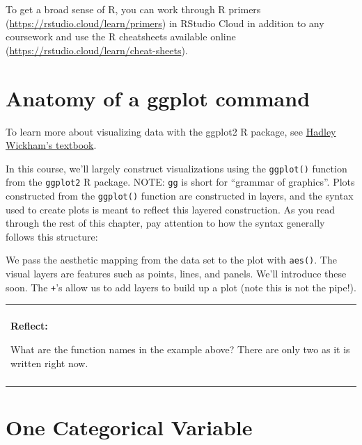 \documentclass[
]{book}
\newenvironment{Shaded}{\begin{snugshade}}{\end{snugshade}}
\newcommand{\DataTypeTok}[1]{\textcolor[rgb]{0.13,0.29,0.53}{#1}}
\newcommand{\KeywordTok}[1]{\textcolor[rgb]{0.13,0.29,0.53}{\textbf{#1}}}
\newcommand{\NormalTok}[1]{#1}
\newcommand{\OperatorTok}[1]{\textcolor[rgb]{0.81,0.36,0.00}{\textbf{#1}}}
\newcommand{\StringTok}[1]{\textcolor[rgb]{0.31,0.60,0.02}{#1}}
\newenvironment{reflect}
{
    \begin{center}
    
    \begin{tabular}{|p{0.8\textwidth}|}
    \rowcolor{LightBlue}
    \hline\\
    \rowcolor{LightBlue}
    \textbf{Reflect:}
}
{
    \\\rowcolor{LightBlue}
    \\\hline
    \end{tabular} 
    \end{center}
}
\begin{document}
To get a broad sense of R, you can work through R primers (\url{https://rstudio.cloud/learn/primers}) in RStudio Cloud in addition to any coursework and use the R cheatsheets available online (\url{https://rstudio.cloud/learn/cheat-sheets}).

\hypertarget{anatomy-of-a-ggplot-command}{%
\section{Anatomy of a ggplot command}\label{anatomy-of-a-ggplot-command}}

To learn more about visualizing data with the ggplot2 R package, see \href{https://r4ds.had.co.nz/data-visualisation.html}{Hadley Wickham's textbook}.

In this course, we'll largely construct visualizations using the \texttt{ggplot()} function from the \texttt{ggplot2} R package. NOTE: \texttt{gg} is short for ``grammar of graphics''. Plots constructed from the \texttt{ggplot()} function are constructed in layers, and the syntax used to create plots is meant to reflect this layered construction. As you read through the rest of this chapter, pay attention to how the syntax generally follows this structure:

\begin{Shaded}
\end{Shaded}

We pass the aesthetic mapping from the data set to the plot with \texttt{aes()}. The visual layers are features such as points, lines, and panels. We'll introduce these soon. The \texttt{+}'s allow us to add layers to build up a plot (note this is not the pipe!).

\begin{reflect}
What are the function names in the example above? There are only two as
it is written right now.
\end{reflect}

\hypertarget{one-categorical-variable}{%
\section{One Categorical Variable}\label{one-categorical-variable}}
\end{document}
